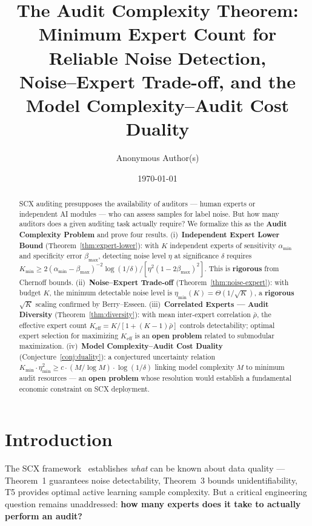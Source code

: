 \documentclass[12pt,a4paper]{article}
\title{\bfseries The Audit Complexity Theorem:\\
Minimum Expert Count for Reliable Noise Detection,\\
Noise--Expert Trade-off, and the\\
Model Complexity--Audit Cost Duality}
\author{Anonymous Author(s)}
\date{\today}
\begin{document}
\maketitle

\begin{abstract}
SCX auditing presupposes the availability of auditors — human experts or
independent AI modules — who can assess samples for label noise.  But how many
auditors does a given auditing task actually require?  We formalize this as the
\textbf{Audit Complexity Problem} and prove four results.  (i)~\textbf{Independent
Expert Lower Bound} (Theorem~\ref{thm:expert-lower}): with $K$ independent
experts of sensitivity $\alpha_{\min}$ and specificity error $\beta_{\max}$,
detecting noise level $\eta$ at significance $\delta$ requires
$K_{\min}\geq 2(\alpha_{\min}-\beta_{\max})^{-2}\log(1/\delta)/[\eta^2(1-2\beta_{\max})^2]$.
This is \textbf{rigorous} from Chernoff bounds.  (ii)~\textbf{Noise--Expert
Trade-off} (Theorem~\ref{thm:noise-expert}): with budget $K$, the minimum
detectable noise level is $\eta_{\min}(K)=\Theta(1/\sqrt{K})$, a
\textbf{rigorous} $\sqrt{K}$ scaling confirmed by Berry--Esseen.
(iii)~\textbf{Correlated Experts — Audit Diversity}
(Theorem~\ref{thm:diversity}): with mean inter-expert correlation $\bar{\rho}$,
the effective expert count $K_{\mathrm{eff}}=K/[1+(K-1)\bar{\rho}]$ controls
detectability; optimal expert selection for maximizing $K_{\mathrm{eff}}$ is an
\textbf{open problem} related to submodular maximization.
(iv)~\textbf{Model Complexity--Audit Cost Duality}
(Conjecture~\ref{conj:duality}): a conjectured uncertainty relation
$K_{\min}\cdot\eta_{\min}^2\geq c\cdot(M/\log M)\cdot\log(1/\delta)$ linking
model complexity $M$ to minimum audit resources — an \textbf{open problem}
whose resolution would establish a fundamental economic constraint on SCX
deployment.
\end{abstract}

\section{Introduction}

The SCX framework~\citep{scx2024cercis} establishes \emph{what} can be known
about data quality — Theorem~1 guarantees noise detectability, Theorem~3 bounds
unidentifiability, T5 provides optimal active learning sample complexity.  But
a critical engineering question remains unaddressed: \textbf{how many experts
does it take to actually perform an audit?}
\end{document}
